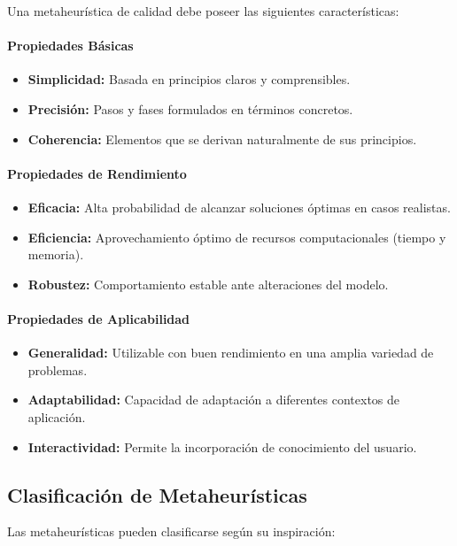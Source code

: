 \documentclass[12pt,titlepage,twoside,openright]{book}
\begin{document}
Una metaheurística de calidad debe poseer las siguientes características:

\paragraph{Propiedades Básicas}
\begin{itemize}
    \item \textbf{Simplicidad:} Basada en principios claros y comprensibles.
    \item \textbf{Precisión:} Pasos y fases formulados en términos concretos.
    \item \textbf{Coherencia:} Elementos que se derivan naturalmente de sus principios.
\end{itemize}

\paragraph{Propiedades de Rendimiento}
\begin{itemize}
    \item \textbf{Eficacia:} Alta probabilidad de alcanzar soluciones óptimas en casos realistas.
    \item \textbf{Eficiencia:} Aprovechamiento óptimo de recursos computacionales (tiempo y memoria).
    \item \textbf{Robustez:} Comportamiento estable ante alteraciones del modelo.
\end{itemize}

\paragraph{Propiedades de Aplicabilidad}
\begin{itemize}
    \item \textbf{Generalidad:} Utilizable con buen rendimiento en una amplia variedad de problemas.
    \item \textbf{Adaptabilidad:} Capacidad de adaptación a diferentes contextos de aplicación.
    \item \textbf{Interactividad:} Permite la incorporación de conocimiento del usuario.
\end{itemize}

\subsection*{Clasificación de Metaheurísticas}

Las metaheurísticas pueden clasificarse según su inspiración:
\end{document}
